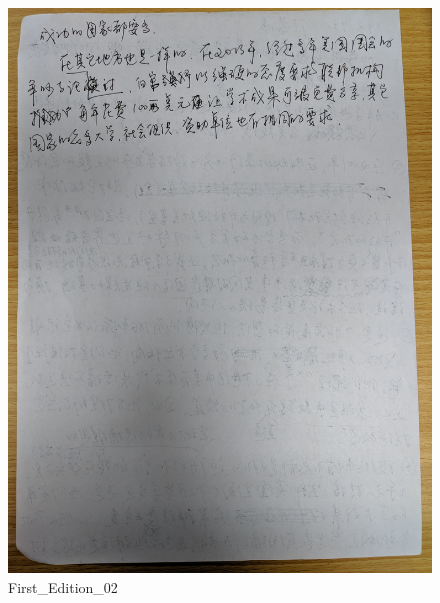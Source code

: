 \documentclass[a4paper, 12pt, UTF8]{article}
\begin{document}
\begin{figure}[htbp]
    \centering
    \includegraphics[width = \textwidth]{original_work_02.jpg}
    \caption{First\_Edition\_02}
    \label{Fig:2}
\end{figure}
\end{document}
